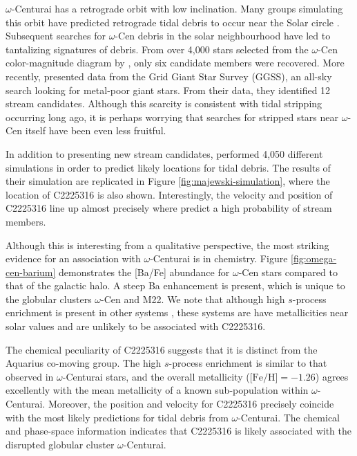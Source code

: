 \documentclass{emulateapj}
\begin{document}
$\omega$-Centurai has a retrograde orbit with low inclination. Many groups simulating this orbit have predicted retrograde tidal debris to occur near the Solar circle \citep{dinescu_2002,tsuchiya_2003,tsuchiya_2004,mizutani_2003,bekki_freeman_2003}. Subsequent searches for $\omega$-Cen debris in the solar neighbourhood have led to tantalizing signatures of debris. From over 4,000 stars selected from the $\omega$-Cen color-magnitude diagram by \citet{da_costa;coleman_2008}, only six candidate members were recovered. More recently, \citet{majewski;et-al_2012} presented data from the Grid Giant Star Survey (GGSS), an all-sky search looking for metal-poor giant stars. From their data, they identified 12 stream candidates. Although this scarcity is consistent with tidal stripping occurring long ago, it is perhaps worrying that searches for stripped stars near $\omega$-Cen itself have been even less fruitful.

In addition to presenting new stream candidates, \citet{majewski;et-al_2012} performed 4,050 different simulations in order to predict likely locations for tidal debris. The results of their simulation are replicated in Figure \ref{fig:majewski-simulation}, where the location of C2225316 is also shown. Interestingly, the velocity and position of C2225316 line up almost precisely where \citet{majewski;et-al_2012} predict a high probability of stream members. 

Although this is interesting from a qualitative perspective, the most striking evidence for an association with $\omega$-Centurai is in chemistry. Figure \ref{fig:omega-cen-barium} demonstrates the [Ba/Fe] abundance for $\omega$-Cen stars compared to that of the galactic halo. A steep Ba enhancement is present, which is unique to the globular clusters $\omega$-Cen and M22. We note that although high $s$-process enrichment is present in other systems \citep[IC 2391, the Argus association;][]{de_silva;et-al_2013}, these systems are have metallicities near solar values and are unlikely to be associated with C2225316.


The chemical peculiarity of C2225316 suggests that it is distinct from the Aquarius co-moving group. The high $s$-process enrichment is similar to that observed in $\omega$-Centurai stars, and the overall metallicity ($\mbox{[Fe/H]} = -1.26$) agrees excellently with the mean metallicity of a known sub-population within $\omega$-Centurai. Moreover, the position and velocity for C2225316 precisely coincide with the most likely predictions for tidal debris from $\omega$-Centurai. The chemical and phase-space information indicates that C2225316 is likely associated with the disrupted globular cluster $\omega$-Centurai.
\end{document}
